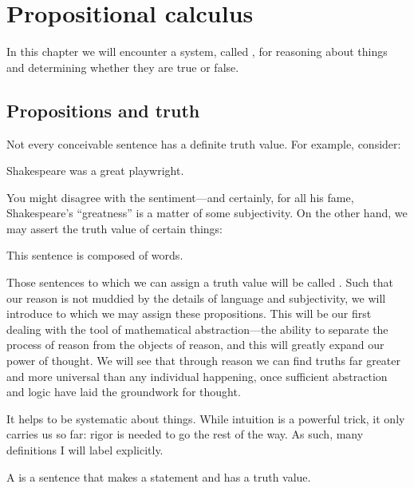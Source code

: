\chapter{Propositional calculus}
\label{ch:propositional}

In this chapter we will encounter a system,
called ,
for reasoning about things and determining whether they are true or false.

\section{Propositions and truth}
\label{sec:propintro}

Not every conceivable sentence has a definite truth value.
For example, consider:
\begin{center}
  Shakespeare was a great playwright.
\end{center}
You might disagree with the sentiment---and certainly, for all his fame,
Shakespeare's ``greatness'' is a matter of some subjectivity.
On the other hand, we may assert the truth value of certain things:
\begin{center}
  This sentence is composed of words.
\end{center}
Those sentences to which we can assign a truth value will be called
.
Such that our reason is not muddied by the details of language and subjectivity,
we will introduce  to which we may assign these propositions.
This will be our first dealing with the tool of mathematical abstraction---the ability
to separate the process of reason from the objects of reason,
and this will greatly expand our power of thought.
We will see that through reason we can find truths far greater and more
universal than any individual happening, once sufficient abstraction
and logic have laid the groundwork for thought.

It helps to be systematic about things.
While intuition is a powerful trick, it only carries us so far:
rigor is needed to go the rest of the way.
As such, many definitions I will label explicitly.

\begin{defn}[proposition]
A  is a sentence that makes a statement
and has a truth value.
\end{defn}

